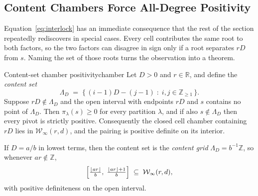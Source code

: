 \documentclass[11pt,letterpaper]{article}
\newcommand{\Zint}{\mathbb{Z}}
\newcommand{\Rr}{\mathbb{R}}
\begin{document}
\subsection{Content Chambers Force All-Degree Positivity}

Equation~\eqref{eq:interlock} has an immediate consequence that the rest of the
section repeatedly rediscovers in special cases. Every cell contributes the same
root to both factors, so the two factors can disagree in sign only if a root
separates $rD$ from $s$. Naming the set of those roots turns the observation
into a theorem.

\begin{theorem}{Content-set chamber positivity}{chamber}
Let $D>0$ and $r\in\Rr$, and define the \emph{content set}
\begin{equation}
  \Lambda_D\;=\;\bigl\{\,(i-1)D-(j-1)\;:\;i,j\in\Zint_{\ge1}\,\bigr\}.
  \label{eq:celllattice}
\end{equation}
Suppose $rD\notin\Lambda_D$ and the open interval with endpoints $rD$ and $s$
contains no point of $\Lambda_D$. Then $\pi_\lambda(s)\ge0$ for every partition
$\lambda$, and if also $s\notin\Lambda_D$ then every pivot is strictly positive.
Consequently the closed cell chamber containing $rD$ lies in
$\mathcal{W}_\infty(r,d)$, and the pairing is positive definite on its interior.

If $D=a/b$ in lowest terms, then the content set is the \emph{content grid} $\Lambda_D=b^{-1}\Zint$, so whenever
$ar\notin\Zint$,
\begin{equation}
  \Bigl[\tfrac{\lfloor ar\rfloor}{b},\;\tfrac{\lfloor ar\rfloor+1}{b}\Bigr]
  \;\subseteq\;\mathcal{W}_\infty(r,d),
  \label{eq:chamber}
\end{equation}
with positive definiteness on the open interval.
\end{theorem}
\end{document}
